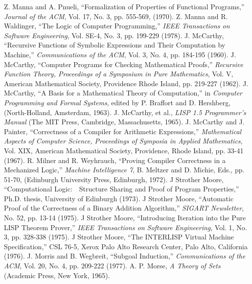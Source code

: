 \documentclass[11pt]{book}
\newcommand{\pubinlineunderline}[1]{\emph{#1}}
\begin{document}
\begin{thebibliography}{99}
 Z. Manna and A. Pnueli, ``Formalization of Properties of Functional Programs,'' \pubinlineunderline{Journal of the ACM}, Vol. 17, No. 3, pp. 555-569, (1970).
 Z. Manna and R. Waldinger, ``The Logic of Computer Programming,'' \pubinlineunderline{IEEE Transactions on Software Engineering}, Vol. SE-4, No. 3, pp. 199-229 (1978).
 J. McCarthy, ``Recursive Functions of Symbolic Expressions and Their Computation by Machine,'' \pubinlineunderline{Communications of the ACM}, Vol. 3, No. 4, pp. 184-195 (1960).
 J. McCarthy, ``Computer Programs for Checking Mathematical Proofs,'' \pubinlineunderline{Recursive Function Theory, Proceedings of a Symposium in Pure Mathematics}, Vol. V, American Mathematical Society, Providence Rhode Island, pp. 219-227 (1962).
 J. McCarthy, ``A Basis for a Mathematical Theory of Computation,'' in \pubinlineunderline{Computer Programming and Formal Systems}, edited by P. Braffort and D. Hershberg, (North-Holland, Amsterdam, 1963).
 J. McCarthy, et al., \pubinlineunderline{LISP 1.5 Programmer's Manual} (The MIT Press, Cambridge, Massachusetts, 1965).
 J. McCarthy and J. Painter, ``Correctness of a Compiler for Arithmetic Expressions,'' \pubinlineunderline{Mathematical Aspects of Computer Science, Proceedings of Symposia in Applied Mathematics},  Vol. XIX, American Mathematical Society, Providence, Rhode Island, pp. 33-41 (1967).
 R. Milner and R. Weyhrauch, ``Proving Compiler Correctness in a Mechanized Logic,'' \pubinlineunderline{Machine Intelligence 7}, B. Meltzer and D. Michie, Eds., pp. 51-70, (Edinburgh University Press, Edinburgh, 1972).
 J Strother Moore, ``Computational Logic:~~Structure Sharing and Proof of Program Properties,'' Ph.D. thesis, University of Edinburgh (1973).
 J Strother Moore, ``Automatic Proof of the Correctness of a Binary Addition Algorithm,'' \pubinlineunderline{SIGART Newsletter}, No. 52, pp. 13-14 (1975).
 J Strother Moore, ``Introducing Iteration into the Pure LISP Theorem Prover,'' \pubinlineunderline{IEEE Transactions on Software Engineering}, Vol. 1, No. 3, pp. 328-338 (1975).
 J Strother Moore, ``The INTERLISP Virtual Machine Specification,'' CSL 76-5, Xerox Palo Alto Research Center, Palo Alto, California (1976).
 J. Morris and B. Wegbreit, ``Subgoal Induction,'' \pubinlineunderline{Communications of the ACM}, Vol. 20, No. 4, pp. 209-222 (1977).
 A. P. Morse, \pubinlineunderline{A Theory of Sets} (Academic Press, New York, 1965).

\end{thebibliography}
\end{document}
